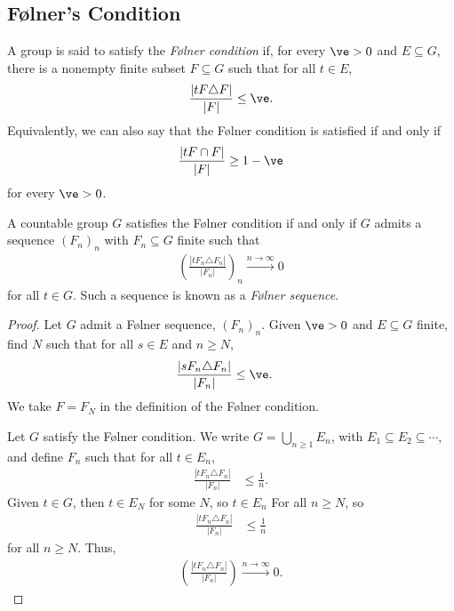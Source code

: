 \documentclass[10pt]{mypackage2}
\begin{document}
\subsection{Følner's Condition}%
\begin{definition}\label{def:folner_condition}
  A group is said to satisfy the \textit{Følner condition} if, for every $\ve > 0$ and $E\subseteq G$, there is a nonempty finite subset $F\subseteq G$ such that for all $t\in E$,
  \begin{align*}
    \frac{\left\vert tF\triangle F \right\vert}{\left\vert F \right\vert}\leq \ve.
  \end{align*}
  Equivalently, we can also say that the Følner condition is satisfied if and only if
  \begin{align*}
    \frac{\left\vert tF\cap F \right\vert}{\left\vert F \right\vert} \geq 1 - \ve
  \end{align*}
  for every $\ve > 0$.
\end{definition}
\begin{lemma}\label{lemma:folner_sequences}
  A countable group $G$ satisfies the Følner condition if and only if $G$ admits a sequence $\left(F_n\right)_n$ with $F_n\subseteq G$ finite such that
  \begin{align*}
    \left(\frac{\left\vert tF_n\triangle F_n \right\vert}{\left\vert F_n \right\vert}\right)_n \xrightarrow{n\rightarrow \infty}0
  \end{align*}
  for all $t\in G$. Such a sequence is known as a \textit{Følner sequence}.
\end{lemma}
\begin{proof}
  Let $G$ admit a Følner sequence, $\left(F_n\right)_n$. Given $\ve > 0$ and $E\subseteq G$ finite, find $N$ such that for all $s\in E$ and $n\geq N$,
  \begin{align*}
    \frac{\left\vert sF_n\triangle F_n \right\vert}{\left\vert F_n \right\vert} &\leq \ve.
  \end{align*}
  We take $F = F_N$ in the definition of the Følner condition.\newline

  Let $G$ satisfy the Følner condition. We write $G = \bigcup_{n\geq 1}E_n$, with $E_1\subseteq E_2\subseteq \cdots$, and define $F_n$ such that for all $t\in E_n$,
  \begin{align*}
    \frac{\left\vert tF_n\triangle F_n \right\vert}{\left\vert F_n \right\vert} &\leq \frac{1}{n}.
  \end{align*}
  Given $t\in G$, then $t\in E_N$ for some $N$, so $t\in E_n$ For all $n\geq N$, so
  \begin{align*}
    \frac{\left\vert tF_n\triangle F_n \right\vert}{\left\vert F_n \right\vert} &\leq \frac{1}{n}
  \end{align*}
  for all $n\geq N$. Thus,
  \begin{align*}
    \left(\frac{\left\vert tF_n\triangle F_n \right\vert}{\left\vert F_n \right\vert}\right)\xrightarrow{n\rightarrow\infty}0.
  \end{align*}
\end{proof}
\end{document}
